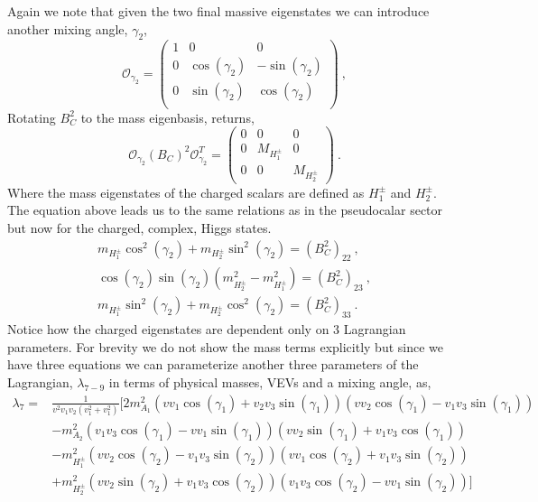 \documentclass[10pt]{report}
\begin{document}
Again we note that given the two final massive eigenstates we can introduce another mixing angle, $\gamma_2$, 
%
\begin{equation}
\mathcal{O}_{\gamma_2} = \begin{pmatrix}
1 & 0 & 0 \\
0 & \cos(\gamma_2) & -\sin(\gamma_2) \\ 
0 & \sin(\gamma_2) & \cos(\gamma_2) \\
\end{pmatrix} \ ,
\end{equation}
Rotating $B_C^2$ to the mass eigenbasis, returns, 
\begin{equation}
\mathcal{O}_{\gamma_2} \left( B_C \right)^2 \mathcal{O}_{\gamma_2}^T   = \begin{pmatrix}
0 & 0 & 0 \\ 
0 & M_{H_1^\pm} & 0 \\ 
0 & 0 & M_{H_2^\pm}  
\end{pmatrix} \ .
\end{equation}
%
Where the mass eigenstates of the charged scalars are defined as $H^\pm_1$ and $H^\pm_2$. 
%
The equation above leads us to the same relations as in the pseudocalar sector but now for the charged, complex, Higgs states. 
\begin{equation}
\begin{split}
m_{H^\pm_1} \cos^2(\gamma_2) + m_{H^\pm_2}  \sin^2(\gamma_2) = \left( B_C^2 \right)_{22}  \ ,   \\
\cos(\gamma_2)\sin(\gamma_2)( m_{H^\pm_2}^2 - m_{H^\pm_1}^2  )  = \left( B_C^2 \right)_{23} \ , \\ 
m_{H^\pm_1} \sin^2(\gamma_2) + m_{H^\pm_2}  \cos^2(\gamma_2) = \left( B_C^2 \right)_{33} \ . 
\end{split} 
\end{equation}
Notice how the charged eigenstates are dependent only on 3 Lagrangian parameters. For brevity we do not show the mass terms explicitly but since we have three equations we can parameterize another three parameters of the Lagrangian, $\lambda_{7-9}$ in terms of physical masses, VEVs and a mixing angle, as, 
\begin{equation}
\begin{split} 
\lambda_7 = & \frac{1}{v^2 v_1v_2 \left(v_1^2+v_1^2\right)} \Bigg[ 2 m_{A_1}^2 \left(v v_1 \cos \left(\gamma_1\right)+ v_2 v_3 \sin \left(\gamma_1\right)\right) \left(vv_2 \cos \left(\gamma_1\right)-v_1v_3 \sin \left(\gamma_1\right)\right) \\ & -m_{A_2}^2 \left(v_1v_3 \cos \left(\gamma_1\right)-vv_1 \sin \left(\gamma_1\right)\right) \left(vv_2 \sin \left(\gamma_1\right)+v_1v_3 \cos \left(\gamma_1\right)\right) \\ & -m_{H_1^\pm}^2 \left(vv_2 \cos \left(\gamma_2\right)-v_1v_3 \sin \left(\gamma_2\right)\right) \left(vv_1 \cos \left(\gamma_2\right)+v_1v_3 \sin \left(\gamma_2\right)\right) \\& +m_{H_2^\pm}^2 \left(vv_2 \sin \left(\gamma_2\right)+v_1v_3 \cos \left(\gamma_2\right)\right) \left(v_1v_3 \cos \left(\gamma_2\right)-vv_1 \sin \left(\gamma_2\right)\right) \Bigg] 
\end{split} 
\end{equation}
\end{document}
